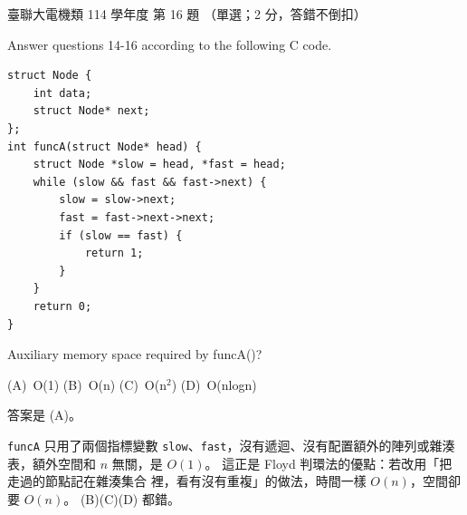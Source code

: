 \begin{pastexam}[label={px:ust-114-ee-ds-16}]{臺聯大電機類 114 學年度 第 16 題}
（單選；2 分，答錯不倒扣）

Answer questions 14-16 according to the following C code.
\begin{verbatim}
struct Node {
    int data;
    struct Node* next;
};
int funcA(struct Node* head) {
    struct Node *slow = head, *fast = head;
    while (slow && fast && fast->next) {
        slow = slow->next;
        fast = fast->next->next;
        if (slow == fast) {
            return 1;
        }
    }
    return 0;
}
\end{verbatim}

Auxiliary memory space required by funcA()?

(A)~O(1) \qquad (B)~O(n) \qquad (C)~O(n$^2$) \qquad (D)~O(nlogn)
\end{pastexam}

\begin{pastsoln}
答案是 (A)。

\texttt{funcA} 只用了兩個指標變數 \texttt{slow}、\texttt{fast}，沒有遞迴、沒有配置額外的陣列或雜湊
表，額外空間和 $n$ 無關，是 $O(1)$。 這正是 Floyd 判環法的優點：若改用「把走過的節點記在雜湊集合
裡，看有沒有重複」的做法，時間一樣 $O(n)$，空間卻要 $O(n)$。 (B)(C)(D) 都錯。
\end{pastsoln}
